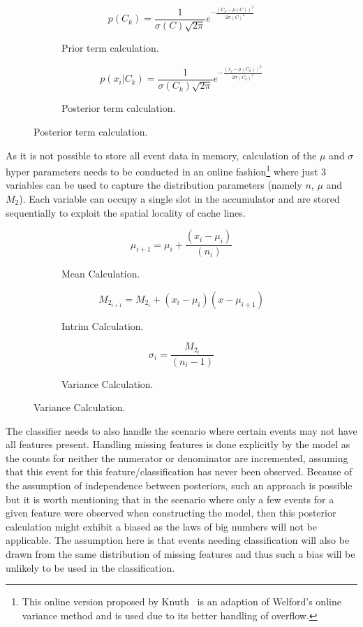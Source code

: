 \documentclass[a4paper,11pt]{scrreprt}
\begin{document}
\begin{figure}[h!]
\begin{subfigure}[t]{2.5 in}
\[p(C_k) = \frac{1}{\sigma(C)\sqrt{2\pi}}e^{-\frac{(C_k - \mu(C))^2}{2\sigma(C)^2}}\]
\caption{Prior term calculation.}
\end{subfigure}
\begin{subfigure}[t]{2.5 in}
\[p(x_i | C_k) = \frac{1}{\sigma(C_k)\sqrt{2\pi}}e^{-\frac{(x_i - \mu(C_k))^2}{2\sigma(C_k)^2}}\]
\caption{Posterior term calculation.}
\end{subfigure}
\end{figure}
As it is not possible to store all event data in memory, calculation of the \(\mu\) and \(\sigma\) hyper parameters needs to be conducted in an online fashion\footnote{This online version proposed by Knuth~\cite{knuth-aop} is an adaption of Welford's online variance method and is used due to its better handling of overflow.} where just 3 variables can be used to capture the distribution parameters (namely \(n\), \(\mu\) and \(M_2\)). Each variable can occupy a single slot in the accumulator and are stored sequentially to exploit the spatial locality of cache lines.

\captionsetup[subfigure]{labelfont=bf,textfont=normalfont,singlelinecheck=off,justification=centering,labelformat=simple, labelsep=colon}
\begin{figure}[h!]
\begin{subfigure}[t]{2.5 in}
\[\mu_{i+1} = \mu_i + \frac{(x_i - \mu_i)}{(n_i)}\]
\caption{Mean Calculation.}
\end{subfigure}
\begin{subfigure}[t]{2.5 in}
\[M_{2_{i+1}} = M_{2_i} + (x_i - \mu_i)(x - \mu_{i+1})\]
\caption{Intrim Calculation.}
\end{subfigure}
\begin{subfigure}[t]{2.5 in}
\[\sigma_i = \frac{M_{2_i}}{(n_i-1)}\]
\caption{Variance Calculation.}
\end{subfigure}
\end{figure}

The classifier needs to also handle the scenario where certain events may not have all features present. Handling missing features is done explicitly by the model as the counts for neither the numerator or denominator are incremented, assuming that this event for this feature/classification has never been observed. Because of the assumption of independence between posteriors, such an approach is possible but it is worth mentioning that in the scenario where only a few events for a given feature were observed when constructing the model, then this posterior calculation might exhibit a biased as the laws of big numbers will not be applicable. The assumption here is that events needing classification will also be drawn from the same distribution of missing features and thus such a bias will be unlikely to be used in the classification.
\end{document}
